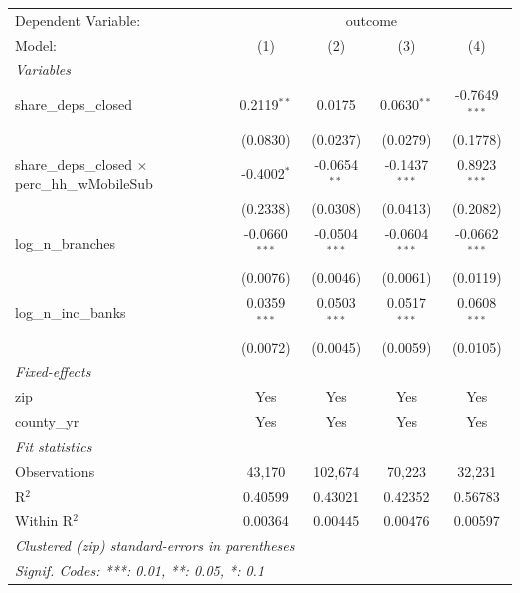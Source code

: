 \begingroup
\centering
\begin{tabular}{lcccc}
   \tabularnewline \midrule \midrule
   Dependent Variable: & \multicolumn{4}{c}{outcome}\\
   Model:                                                 & (1)             & (2)             & (3)             & (4)\\  
   \midrule
   \emph{Variables}\\
   share\_deps\_closed                                    & 0.2119$^{**}$   & 0.0175          & 0.0630$^{**}$   & -0.7649$^{***}$\\   
                                                          & (0.0830)        & (0.0237)        & (0.0279)        & (0.1778)\\   
   share\_deps\_closed $\times$ perc\_hh\_wMobileSub      & -0.4002$^{*}$   & -0.0654$^{**}$  & -0.1437$^{***}$ & 0.8923$^{***}$\\   
                                                          & (0.2338)        & (0.0308)        & (0.0413)        & (0.2082)\\   
   log\_n\_branches                                       & -0.0660$^{***}$ & -0.0504$^{***}$ & -0.0604$^{***}$ & -0.0662$^{***}$\\   
                                                          & (0.0076)        & (0.0046)        & (0.0061)        & (0.0119)\\   
   log\_n\_inc\_banks                                     & 0.0359$^{***}$  & 0.0503$^{***}$  & 0.0517$^{***}$  & 0.0608$^{***}$\\   
                                                          & (0.0072)        & (0.0045)        & (0.0059)        & (0.0105)\\   
   \midrule
   \emph{Fixed-effects}\\
   zip                                                    & Yes             & Yes             & Yes             & Yes\\  
   county\_yr                                             & Yes             & Yes             & Yes             & Yes\\  
   \midrule
   \emph{Fit statistics}\\
   Observations                                           & 43,170          & 102,674         & 70,223          & 32,231\\  
   R$^2$                                                  & 0.40599         & 0.43021         & 0.42352         & 0.56783\\  
   Within R$^2$                                           & 0.00364         & 0.00445         & 0.00476         & 0.00597\\  
   \midrule \midrule
   \multicolumn{5}{l}{\emph{Clustered (zip) standard-errors in parentheses}}\\
   \multicolumn{5}{l}{\emph{Signif. Codes: ***: 0.01, **: 0.05, *: 0.1}}\\
\end{tabular}
\par\endgroup
